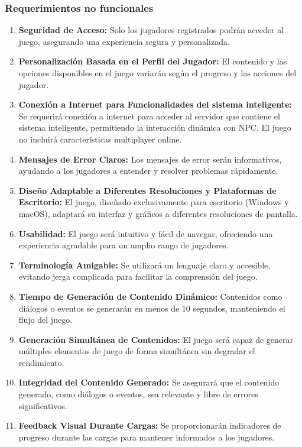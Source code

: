 \documentclass[12pt,twoside]{article}
\begin{document}
	\subsubsection{Requerimientos no funcionales}
	
	\begin{enumerate}[label=RNF\arabic*]
		\item \textbf{Seguridad de Acceso: }Solo los jugadores registrados podrán acceder al juego, asegurando una experiencia segura y personalizada.
		\item \textbf{Personalización Basada en el Perfil del Jugador: }El contenido y las opciones disponibles en el juego variarán según el progreso y las acciones del jugador.
		\item \textbf{Conexión a Internet para Funcionalidades del sistema inteligente: }Se requerirá conexión a internet para acceder al servidor que contiene el sistema inteligente, permitiendo la interacción dinámica con NPC. El juego no incluirá características multiplayer online.
		\item \textbf{Mensajes de Error Claros: }Los mensajes de error serán informativos, ayudando a los jugadores a entender y resolver problemas rápidamente.
		\item \textbf{Diseño Adaptable a Diferentes Resoluciones y Plataformas de Escritorio:} El juego, diseñado exclusivamente para escritorio (Windows y macOS), adaptará su interfaz y gráficos a diferentes resoluciones de pantalla.
		\item \textbf{Usabilidad: }El juego será intuitivo y fácil de navegar, ofreciendo una experiencia agradable para un amplio rango de jugadores.
		\item \textbf{Terminología Amigable: }Se utilizará un lenguaje claro y accesible, evitando jerga complicada para facilitar la comprensión del juego.
		\item \textbf{Tiempo de Generación de Contenido Dinámico:} Contenidos como diálogos o eventos se generarán en menos de 10 segundos, manteniendo el flujo del juego.
		\item \textbf{Generación Simultánea de Contenidos: }El juego será capaz de generar múltiples elementos de juego de forma simultánea sin degradar el rendimiento.
		\item \textbf{Integridad del Contenido Generado: }Se asegurará que el contenido generado, como diálogos o eventos, sea relevante y libre de errores significativos.
		\item \textbf{Feedback Visual Durante Cargas: }Se proporcionarán indicadores de progreso durante las cargas para mantener informados a los jugadores.

\end{enumerate}
\end{document}
